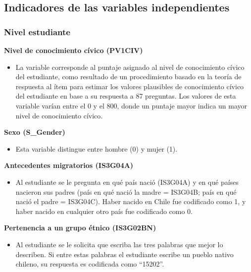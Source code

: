 \documentclass[12pt,twoside]{templates/facsothesis}
\providecommand{\tightlist}{%
  \setlength{\itemsep}{0pt}\setlength{\parskip}{0pt}}
\begin{document}
\hypertarget{indicadores-de-las-variables-independientes}{%
\subsection{Indicadores de las variables independientes}\label{indicadores-de-las-variables-independientes}}

\hypertarget{nivel-estudiante}{%
\subsubsection{Nivel estudiante}\label{nivel-estudiante}}

\textbf{Nivel de conocimiento cívico (PV1CIV)}

\begin{itemize}
\tightlist
\item
  La variable corresponde al puntaje asignado al nivel de conocimiento cívico del estudiante, como resultado de un procedimiento basado en la teoría de respuesta al ítem para estimar los valores plausibles de conocimiento cívico del estudiante en base a su respuesta a 87 preguntas. Los valores de esta variable varían entre el 0 y el 800, donde un puntaje mayor indica un mayor nivel de conocimiento cívico.
\end{itemize}

\textbf{Sexo (S\_Gender)}

\begin{itemize}
\tightlist
\item
  Esta variable distingue entre hombre (0) y mujer (1).
\end{itemize}

\textbf{Antecedentes migratorios (IS3G04A)}

\begin{itemize}
\tightlist
\item
  Al estudiante se le pregunta en qué país nació (IS3G04A) y en qué países nacieron sus padres (país en qué nació la madre = IS3G04B; país en qué nació el padre = IS3G04C). Haber nacido en Chile fue codificado como 1, y haber nacido en cualquier otro país fue codificado como 0.
\end{itemize}

\textbf{Pertenencia a un grupo étnico (IS3G02BN)}

\begin{itemize}
\tightlist
\item
  Al estudiante se le solicita que escriba las tres palabras que mejor lo describen. Si entre estas palabras el estudiante escribe un pueblo nativo chileno, su respuesta es codificada como ``15202''.
\end{itemize}
\end{document}
